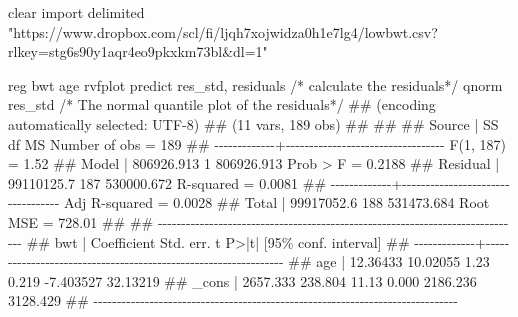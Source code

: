 \documentclass[
  letterpaper,
  DIV=11,
  numbers=noendperiod]{scrreprt}
\newenvironment{Shaded}{\begin{snugshade}}{\end{snugshade}}
\newcommand{\CommentTok}[1]{\textcolor[rgb]{0.37,0.37,0.37}{#1}}
\newcommand{\DataTypeTok}[1]{\textcolor[rgb]{0.68,0.00,0.00}{#1}}
\newcommand{\FunctionTok}[1]{\textcolor[rgb]{0.28,0.35,0.67}{#1}}
\newcommand{\KeywordTok}[1]{\textcolor[rgb]{0.00,0.23,0.31}{#1}}
\newcommand{\NormalTok}[1]{\textcolor[rgb]{0.00,0.23,0.31}{#1}}
\newcommand{\StringTok}[1]{\textcolor[rgb]{0.13,0.47,0.30}{#1}}
\begin{document}
\begin{Shaded}
\begin{Highlighting}[]
\KeywordTok{clear}
\NormalTok{import delimited }\StringTok{"https://www.dropbox.com/scl/fi/ljqh7xojwidza0h1e7lg4/lowbwt.csv?rlkey=stg6s90y1aqr4eo9pkxkm73bl\&dl=1"}

\KeywordTok{reg}\NormalTok{ bwt age}
\KeywordTok{rvfplot} 
\KeywordTok{predict}\NormalTok{ res\_std, residuals }\CommentTok{/* calculate the residuals*/}
\KeywordTok{qnorm}\NormalTok{ res\_std }\CommentTok{/* The normal quantile plot of the residuals*/}
\NormalTok{\#\# (encoding automatically selected: UTF{-}8)}
\NormalTok{\#\# (11 vars, 189 }\KeywordTok{obs}\NormalTok{)}
\NormalTok{\#\# }
\NormalTok{\#\# }
\NormalTok{\#\#       Source |       SS           df       MS      Number }\KeywordTok{of} \KeywordTok{obs}\NormalTok{   =       189}
\NormalTok{\#\# {-}{-}{-}{-}{-}{-}{-}{-}{-}{-}{-}{-}{-}+{-}{-}{-}{-}{-}{-}{-}{-}{-}{-}{-}{-}{-}{-}{-}{-}{-}{-}{-}{-}{-}{-}{-}{-}{-}{-}{-}{-}{-}{-}{-}{-}{-}{-}   }\FunctionTok{F}\NormalTok{(1, 187)       =      1.52}
\NormalTok{\#\#        Model |  806926.913         1  806926.913   Prob \textgreater{} }\FunctionTok{F}\NormalTok{        =    0.2188}
\NormalTok{\#\#     Residual |  99110125.7       187  530000.672   R{-}squared       =    0.0081}
\NormalTok{\#\# {-}{-}{-}{-}{-}{-}{-}{-}{-}{-}{-}{-}{-}+{-}{-}{-}{-}{-}{-}{-}{-}{-}{-}{-}{-}{-}{-}{-}{-}{-}{-}{-}{-}{-}{-}{-}{-}{-}{-}{-}{-}{-}{-}{-}{-}{-}{-}   Adj R{-}squared   =    0.0028}
\NormalTok{\#\#        Total |  99917052.6       188  531473.684   Root MSE        =    728.01}
\NormalTok{\#\# }
\NormalTok{\#\# {-}{-}{-}{-}{-}{-}{-}{-}{-}{-}{-}{-}{-}{-}{-}{-}{-}{-}{-}{-}{-}{-}{-}{-}{-}{-}{-}{-}{-}{-}{-}{-}{-}{-}{-}{-}{-}{-}{-}{-}{-}{-}{-}{-}{-}{-}{-}{-}{-}{-}{-}{-}{-}{-}{-}{-}{-}{-}{-}{-}{-}{-}{-}{-}{-}{-}{-}{-}{-}{-}{-}{-}{-}{-}{-}{-}{-}{-}}
\NormalTok{\#\#          bwt | Coefficient  Std. err.      t    P\textgreater{}|t|     [95\% conf. interval]}
\NormalTok{\#\# {-}{-}{-}{-}{-}{-}{-}{-}{-}{-}{-}{-}{-}+{-}{-}{-}{-}{-}{-}{-}{-}{-}{-}{-}{-}{-}{-}{-}{-}{-}{-}{-}{-}{-}{-}{-}{-}{-}{-}{-}{-}{-}{-}{-}{-}{-}{-}{-}{-}{-}{-}{-}{-}{-}{-}{-}{-}{-}{-}{-}{-}{-}{-}{-}{-}{-}{-}{-}{-}{-}{-}{-}{-}{-}{-}{-}{-}}
\NormalTok{\#\#          age |   12.36433   10.02055     1.23   0.219    {-}7.403527    32.13219}
\NormalTok{\#\#        }\DataTypeTok{\_cons}\NormalTok{ |   2657.333    238.804    11.13   0.000     2186.236    3128.429}
\NormalTok{\#\# {-}{-}{-}{-}{-}{-}{-}{-}{-}{-}{-}{-}{-}{-}{-}{-}{-}{-}{-}{-}{-}{-}{-}{-}{-}{-}{-}{-}{-}{-}{-}{-}{-}{-}{-}{-}{-}{-}{-}{-}{-}{-}{-}{-}{-}{-}{-}{-}{-}{-}{-}{-}{-}{-}{-}{-}{-}{-}{-}{-}{-}{-}{-}{-}{-}{-}{-}{-}{-}{-}{-}{-}{-}{-}{-}{-}{-}{-}}
\end{Highlighting}
\end{Shaded}
\end{document}
